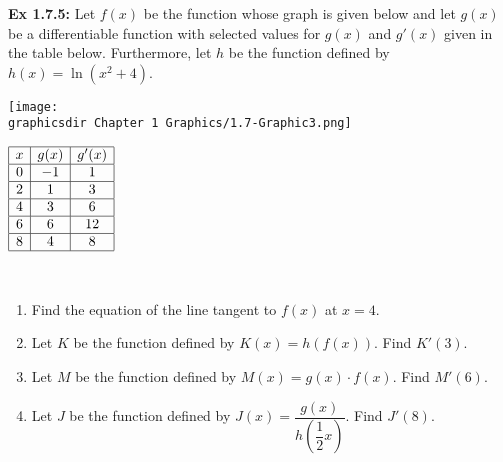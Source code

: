 \begin{tcolorbox}[example]
    \textbf{Ex 1.7.5: } Let $f(x)$ be the function whose graph is given below and let $g(x)$ be a differentiable function with selected values for $g(x)$ and $g'(x)$ given in the table below. Furthermore, let $h$ be the function defined by $h(x) = \ln \left(x^2 + 4\right)$. \\
    \begin{minipage}[t]{0.75\textwidth} \vspace{0pt}%
        \texttt{[image: \\graphicsdir Chapter 1 Graphics/1.7-Graphic3.png]}
    \end{minipage} \hfill \begin{minipage}[t]{0.2\textwidth} \vspace{0pt}%
        \def\arraystretch{1.4}
        $\begin{array}{|c|c|c|}
            \hline
            x & g(x) & g'(x) \\ \hline
            0 & -1 & 1 \\ \hline
            2 & 1 & 3 \\ \hline
            4 & 3 & 6 \\ \hline
            6 & 6 & 12 \\ \hline
            8 & 4 & 8 \\
            \hline
        \end{array}$
    \end{minipage} \\[11pt]
    \begin{enumerate}[label=\hspace{11pt}(\alph*), align=left, leftmargin=*, labelsep=0.25em]
        \item Find the equation of the line tangent to $f(x)$ at $x = 4$. \\
        \item Let $K$ be the function defined by $K(x) = h(f(x))$. Find $K'(3)$. \\
        \item Let $M$ be the function defined by $M(x) = g(x) \cdot f(x)$. Find $M'(6)$. \\
        \item Let $J$ be the function defined by $J(x) = \dfrac{g(x)}{h\left(\dfrac{1}{2}x\right)}$. Find $J'(8)$. \\
    \end{enumerate}
\end{tcolorbox}

